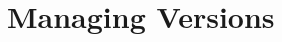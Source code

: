 \begin{comment}
		\subitem The algorithm evaluates the matrix greedily and adds new mappings up to a maximum distance of 0.9. Thus, nodes which have nothing in common will not be connected 
		\subitem Additional mapping rules capture the domain characteristics of the processed data. Following the current specifications for SBML and CellML, we prohibit certain changes in the hierarchical tree of document nodes. Specifically, we treat parts of the model as atomic con- structs for which we define restrictions on possible network operations 
		\subitem This step is a major reason why our algorithm outperforms standard XML diff algorithms. 
		\subitem insert if an entity is present in T 2 but absent in T 
		\subitem delete if an entity is present in T 1 but absent in T 
		\subitem move if a node is present in both documents, but either (i) the parents in the corresponding trees are not connected or (ii) the parents are connected, but the sequence of their siblings has changed 
		\subitem update if the value of an attribute, a text node's content or the tag name of a node was modified
		\subitem After the mapping, we distinguish two types of nodes: mapped nodes and unmapped nodes. Unmapped nodes n 2 T 1 [ T 2 are nodes for which the algorithm could not find a matching node in the opposite tree. These nodes and their attributes correspond to either inserts or deletes, depending on their origin 
		\subitem In contrast, mapped nodes are nodes for which the algorithm did find a matching node in the opposite tree. If the parents of such a mapping of n 2 T 2 onto m 2 T 1 are not connected, or if the se- quence among their siblings has changed, then these nodes are included in the set of moves 
	\end{itemize}
	\end{comment}
	
\section{Managing Versions}
